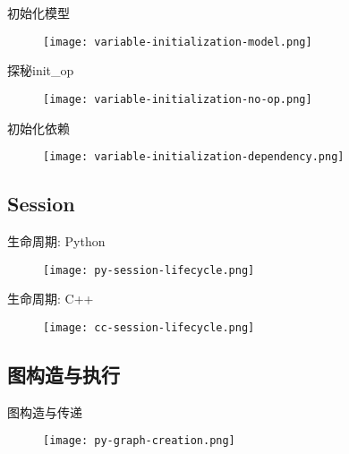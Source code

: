 \begin{frame}{初始化模型}
  \begin{figure}
    \centering
    \texttt{[image: variable-initialization-model.png]}
  \end{figure}
\end{frame}

\begin{frame}{探秘init\_op}
  \begin{figure}
    \centering
    \texttt{[image: variable-initialization-no-op.png]}
  \end{figure}
\end{frame}

\begin{frame}{初始化依赖}
  \begin{figure}
    \centering
    \texttt{[image: variable-initialization-dependency.png]}
  \end{figure}
\end{frame}

\subsection{Session}

\begin{frame}{生命周期: Python}
  \begin{figure}
    \centering
    \texttt{[image: py-session-lifecycle.png]}
  \end{figure}
\end{frame}

\begin{frame}{生命周期: C++}
  \begin{figure}
    \centering
    \texttt{[image: cc-session-lifecycle.png]}
  \end{figure}
\end{frame}

\subsection{图构造与执行}

\begin{frame}{图构造与传递}
  \begin{figure}
    \centering
    \texttt{[image: py-graph-creation.png]}
  \end{figure}
\end{frame}

